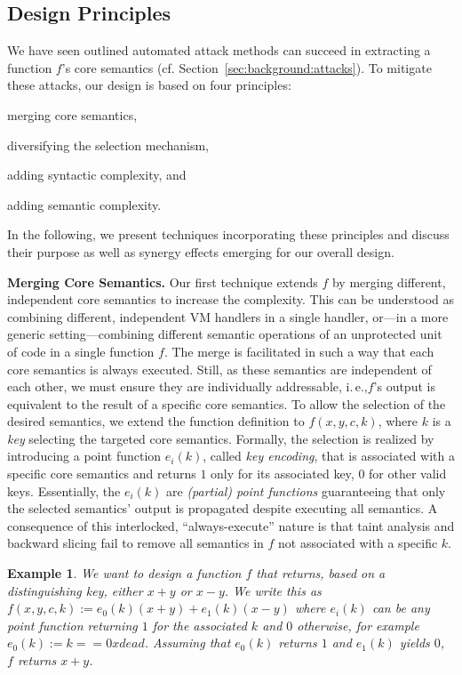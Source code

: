 \documentclass[letterpaper,twocolumn,10pt]{article}
\newcommand{\ie}{i.\,e.,\xspace}
\newcommand{\cf}{cf.\xspace}
\theoremstyle{customexample}
\newtheorem{example}{Example}
\theoremstyle{customexperiment}
\begin{document}
\subsection{Design Principles}

We have seen outlined automated attack methods can succeed in extracting a function $f$'s core semantics (\cf Section~\ref{sec:background:attacks}).
To mitigate these attacks, our design is based on four principles:
\begin{inparaenum}[(1)]
\item merging core semantics,
\item diversifying the selection mechanism,
\item adding syntactic complexity, and
\item adding semantic complexity.
\end{inparaenum}
In the following, we present techniques incorporating these principles and discuss their purpose as well as synergy effects emerging for our overall design. 



\textbf{Merging Core Semantics.}
Our first technique extends $f$ by merging different, independent core semantics to increase the complexity. This can be understood as combining different, independent VM handlers in a single handler, or---in a more generic setting---combining different semantic operations of an unprotected unit of code in a single function $f$.
The merge is facilitated in such a way that each core semantics is always executed. Still, as these semantics are independent of each other, we must ensure they are individually addressable, \ie $f$'s output is equivalent to the result of a specific core semantics.
To allow the selection of the desired semantics, we extend the function definition to $f(x, y, c, k)$, where $k$ is a \emph{key} selecting the targeted core semantics.
Formally, the selection is realized by introducing a point function $e_i(k)$, called \emph{key encoding}, that is associated with a specific core semantics and returns $1$ only for its associated key, $0$ for other valid keys. Essentially, the $e_i(k)$ are \emph{(partial) point functions} guaranteeing that only the selected semantics' output is propagated despite executing all semantics.
A consequence of this interlocked, \enquote{always-execute} nature is that taint analysis and backward slicing fail to remove all semantics in $f$ not associated with a specific $k$. 

\begin{example}
We want to design a function $f$ that returns, based on a distinguishing key, either $x + y$ or $x - y$. We write this as $f(x, y, c, k) := e_0(k)(x + y) + e_1(k)(x - y)$ where $e_i(k)$ can be any point function returning $1$ for the associated $k$ and $0$ otherwise, for example $e_0(k) := k == 0xdead$. Assuming that $e_0(k)$ returns $1$ and $e_1(k)$ yields $0$, $f$ returns $x + y$.
\end{example}
\end{document}
